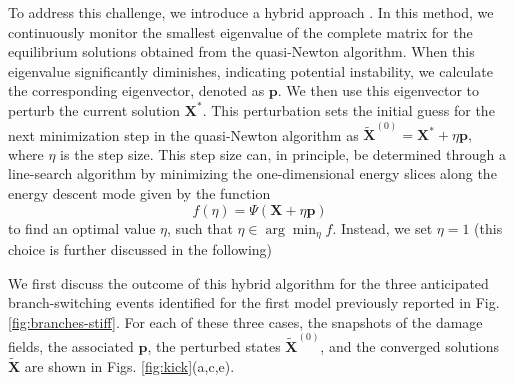 To address this challenge, we introduce a hybrid approach . In this method, we continuously monitor the smallest eigenvalue of the complete  matrix for the equilibrium solutions obtained from the quasi-Newton algorithm.
When this eigenvalue significantly diminishes, indicating potential instability, we calculate the corresponding eigenvector, denoted as \(\mathbf{p}\). We then use this eigenvector to perturb the current solution $\mathbf{X^*}$. This perturbation sets the initial guess for the next minimization step in the quasi-Newton algorithm as $\mathbf{\tilde X}^{(0)} = \mathbf{X^*} + \eta \mathbf{p},
$ where \(\eta\) is the step size.
This step size can, in principle, be determined through a line-search algorithm by minimizing the one-dimensional energy slices along the energy descent mode given by the function 
$$f(\eta) = \Psi(\mathbf{X} + \eta \mathbf{p})
\label{eqn:energy-slice}$$
 to find an optimal value \(\eta\), such that $\eta \in \arg \min_{\eta} f$. Instead, we   set \(\eta = 1\)  (this choice is further discussed in the following) 

We first discuss the outcome of this hybrid algorithm for the three anticipated branch-switching events identified for the first model previously reported in Fig. \ref{fig:branches-stiff}. For each of these three cases, the snapshots of the damage fields, the associated  \(\mathbf{p}\),  the perturbed states \(\mathbf{\tilde X}^{(0)}\), and the converged solutions $\mathbf{\tilde X}$ are shown in Figs. \ref{fig:kick}(a,c,e).

